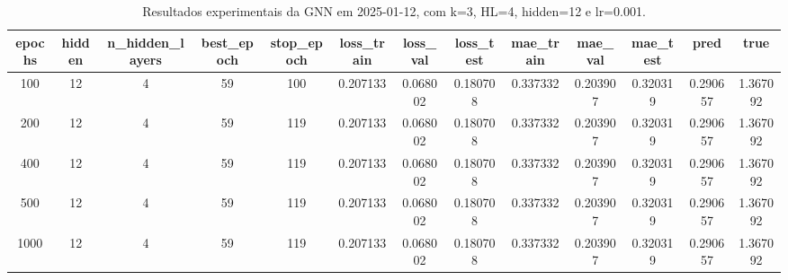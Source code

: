 \begin{table}[h]
\centering
\caption{Resultados experimentais da GNN em 2025-01-12, com k=3, HL=4, hidden=12 e lr=0.001.}
\label{tab:gnn_results_k3_hl4_h12_d20250112}
\begin{tabular}{ccccccccccccc}
\toprule
epochs & hidden & n\_hidden\_layers & best\_epoch & stop\_epoch & loss\_train & loss\_val & loss\_test & mae\_train & mae\_val & mae\_test & pred & true \\
\midrule
100 & 12 & 4 & 59 & 100 & 0.207133 & 0.068002 & 0.180708 & 0.337332 & 0.203907 & 0.320319 & 0.290657 & 1.367092 \\
200 & 12 & 4 & 59 & 119 & 0.207133 & 0.068002 & 0.180708 & 0.337332 & 0.203907 & 0.320319 & 0.290657 & 1.367092 \\
400 & 12 & 4 & 59 & 119 & 0.207133 & 0.068002 & 0.180708 & 0.337332 & 0.203907 & 0.320319 & 0.290657 & 1.367092 \\
500 & 12 & 4 & 59 & 119 & 0.207133 & 0.068002 & 0.180708 & 0.337332 & 0.203907 & 0.320319 & 0.290657 & 1.367092 \\
1000 & 12 & 4 & 59 & 119 & 0.207133 & 0.068002 & 0.180708 & 0.337332 & 0.203907 & 0.320319 & 0.290657 & 1.367092 \\
\bottomrule
\end{tabular}
\end{table}
